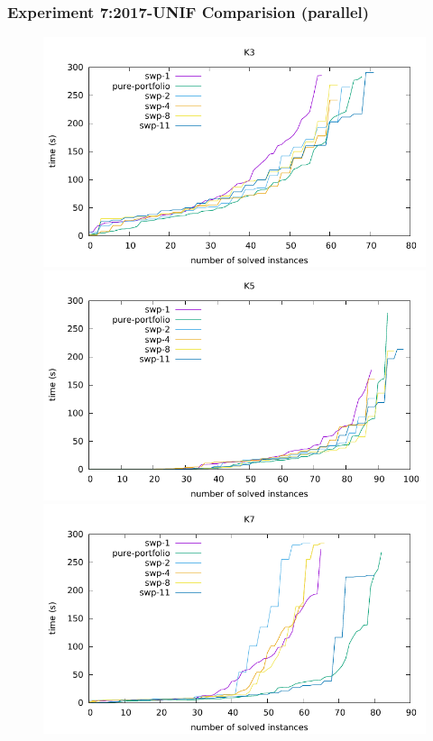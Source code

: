 \documentclass[12pt,a4paper,twoside]{scrartcl}
\numberwithin{equation}{section}
\begin{document}
\subsubsection{Experiment 7:2017-UNIF Comparision (parallel)} 
\label{sec:Experiment 7}

 \begin{figure}[H]
\begin{center}
  \includegraphics[scale = 1]{Parallel/K3/e2.pdf}
    \includegraphics[scale = 1]{Parallel/K5/e2.pdf}
  \includegraphics[scale = 1]{Parallel/K7/e2.pdf}
  \end{center}
  \caption{}
  \label{Experiment 6 COMBINE}
  \end{figure}
\clearpage
\end{document}
